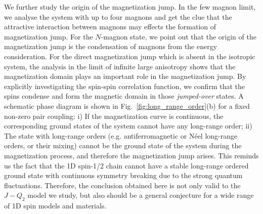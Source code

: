 \documentclass[article,10pt,onecolumn,superscriptaddress,floatfix]{revtex4}
\begin{document}
We further study the origin of the magnetization jump. In the few magnon limit, we analyse the system with up to four magnons and get the clue that the attractive interaction between magnons may effects the formation of magnetization jump.
For the $N$-magnon state, we point out that the origin of the magnetization jump is the condensation of magnons from the energy consideration. For the direct magnetization jump which is absent in the isotropic system, the analysis in the limit of infinite large anisotropy shows that the magnetization domain plays an important role in the magnetization jump. By explicitly investigating the spin-spin correlation function, we confirm that the spins condense and form the magnetic domain in those \textit{jumped-over} states. A schematic phase diagram is shown in Fig.~\ref{fig:long_range_order}(b) for a fixed non-zero pair coupling: i) If the magnetization curve is continuous, the corresponding ground states of the system cannot have any long-range order; ii) The state with long-range orders (e.g. antiferromagnetic or N\'eel long-range orders, or their mixing) cannot be the ground state of the system during the magnetization process, and therefore the magnetization jump arises. This reminds us the fact that the 1D spin-1/2 chain cannot have a stable long-range ordered ground state \cite{Landau1958} with continuous symmetry breaking due to the strong quantum fluctuations. Therefore, the conclusion obtained here is not only valid to the $J-Q_{2}$ model we study, but also should be a general conjecture for a wide range of 1D spin models and materials.
\end{document}
